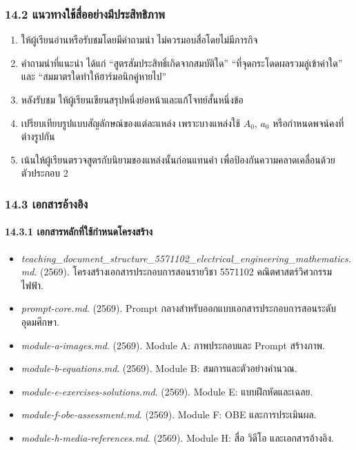 \subsubsection{14.2 แนวทางใช้สื่ออย่างมีประสิทธิภาพ}

\begin{enumerate}
\def\labelenumi{\arabic{enumi}.}
\item
  ให้ผู้เรียนอ่านหรือรับชมโดยมีคำถามนำ ไม่ควรมอบสื่อโดยไม่มีภารกิจ
\item
  คำถามนำที่แนะนำ ได้แก่ ``สูตรสัมประสิทธิ์เกิดจากสมบัติใด'' ``ที่จุดกระโดดผลรวมลู่เข้าค่าใด'' และ ``สมมาตรใดทำให้ฮาร์มอนิกคู่หายไป''
\item
  หลังรับชม ให้ผู้เรียนเขียนสรุปหนึ่งย่อหน้าและแก้โจทย์สั้นหนึ่งข้อ
\item
  เปรียบเทียบรูปแบบสัญลักษณ์ของแต่ละแหล่ง เพราะบางแหล่งใช้ \(A_0\), \(a_0\) หรือกำหนดพจน์คงที่ต่างรูปกัน
\item
  เน้นให้ผู้เรียนตรวจสูตรกับนิยามของแหล่งนั้นก่อนแทนค่า เพื่อป้องกันความคลาดเคลื่อนด้วยตัวประกอบ 2
\end{enumerate}


\subsubsection{14.3 เอกสารอ้างอิง}

\paragraph{14.3.1 เอกสารหลักที่ใช้กำหนดโครงสร้าง}

\begin{itemize}
\item
  \textit{teaching\_document\_structure\_5571102\_electrical\_engineering\_mathematics.md}. (2569). โครงสร้างเอกสารประกอบการสอนรายวิชา 5571102 คณิตศาสตร์วิศวกรรมไฟฟ้า.
\item
  \textit{prompt-core.md}. (2569). Prompt กลางสำหรับออกแบบเอกสารประกอบการสอนระดับอุดมศึกษา.
\item
  \textit{module-a-images.md}. (2569). Module A: ภาพประกอบและ Prompt สร้างภาพ.
\item
  \textit{module-b-equations.md}. (2569). Module B: สมการและตัวอย่างคำนวณ.
\item
  \textit{module-e-exercises-solutions.md}. (2569). Module E: แบบฝึกหัดและเฉลย.
\item
  \textit{module-f-obe-assessment.md}. (2569). Module F: OBE และการประเมินผล.
\item
  \textit{module-h-media-references.md}. (2569). Module H: สื่อ วิดีโอ และเอกสารอ้างอิง.
\end{itemize}

